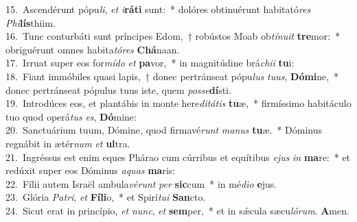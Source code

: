 {15.~}Ascendérunt pópu\textit{li}, \textit{et} \textit{i}\textbf{rá}\textbf{ti} sunt:~* dolóres obtinuérunt habitató\textit{res} \textit{Phi}\textbf{lís}thiim.\\
{16.~}Tunc conturbáti sunt príncipes Edom,~† robústos Moab ob\textit{tí}\textit{nu}\textit{it} \textbf{tre}mor:~* obriguérunt omnes habita\textit{tó}\textit{res} \textbf{Chá}naan.\\
{17.~}Irruat super eos for\textit{mí}\textit{do} \textit{et} \textbf{pa}vor,~* in magnitúdine brá\textit{chi}\textit{i} \textbf{tu}i:\\
{18.~}Fiant immóbiles quasi lapis,~† donec pertránseat pópu\textit{lus} \textit{tu}\textit{us}, \textbf{Dó}\textbf{mi}ne,~* donec pertránseat pópulus tuus iste, quem \textit{pos}\textit{se}\textbf{dí}sti.\\
{19.~}Introdúces eos, et plantábis in monte here\textit{di}\textit{tá}\textit{tis} \textbf{tu}æ,~* firmíssimo habitáculo tuo quod operá\textit{tus} \textit{es}, \textbf{Dó}mine:\\
{20.~}Sanctuárium tuum, Dómine, quod firmavé\textit{runt} \textit{ma}\textit{nus} \textbf{tu}æ.~* Dóminus regnábit in ætér\textit{num} \textit{et} \textbf{ul}tra.\\
{21.~}Ingréssus est enim eques Phárao cum cúrribus et equítibus \textit{e}\textit{jus} \textit{in} \textbf{ma}re:~* et redúxit super eos Dóminus \textit{a}\textit{quas} \textbf{ma}ris:\\
{22.~}Fílii autem Israël ambula\textit{vé}\textit{runt} \textit{per} \textbf{sic}cum~* in mé\textit{di}\textit{o} \textbf{e}jus.\\
{23.~}Glória \textit{Pa}\textit{tri}, \textit{et} \textbf{Fí}\textbf{li}o,~* et Spirí\textit{tu}\textit{i} \textbf{San}cto.\\
{24.~}Sicut erat in princípio, \textit{et} \textit{nunc}, \textit{et} \textbf{sem}per,~* et in sǽcula sæcu\textit{ló}\textit{rum}. \textbf{A}men.\\

